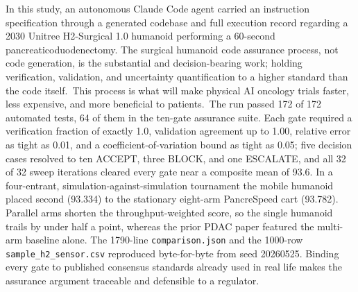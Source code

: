 
In this study, an autonomous Claude Code agent carried an instruction specification through a generated codebase and full
execution record regarding a 2030 Unitree
H2-Surgical 1.0 humanoid performing a 60-second pancreaticoduodenectomy. The surgical humanoid code assurance process, not code
generation, is the substantial and decision-bearing work; holding verification,
validation, and uncertainty quantification to a higher standard than the code
itself.\ This process is what will make physical AI oncology trials faster, less
expensive, and more beneficial to patients.\ The run passed 172 of 172 automated
tests, 64 of them in the ten-gate assurance suite. Each gate required a
verification fraction of exactly 1.0, validation agreement up to 1.00, relative
error as tight as 0.01, and a coefficient-of-variation bound as tight as 0.05;
five decision cases resolved to ten ACCEPT, three BLOCK, and one ESCALATE, and
all 32 of 32 sweep iterations cleared every gate near a composite mean of 93.6.
In a four-entrant, simulation-against-simulation tournament the mobile humanoid
placed second (93.334) to the stationary eight-arm PancreSpeed cart (93.782). Parallel arms
shorten the throughput-weighted score, so the single humanoid trails by under
half a point, whereas the prior PDAC paper featured the multi-arm baseline alone.
The 1790-line \texttt{comparison.json} and the 1000-row
\texttt{sample\_h2\_sensor.csv} reproduced byte-for-byte from seed 20260525.
Binding every gate to published consensus standards already used in real life
makes the assurance argument traceable and defensible to a regulator.
